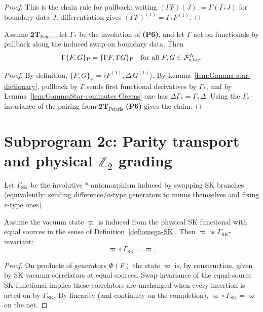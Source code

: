 \begin{proof}
This is the chain rule for pullback: writing $(\Gamma F)(J):=F(\Gamma_*J)$ for
boundary data $J$, differentiation gives $(\Gamma F)^{(1)}=\Gamma_* F^{(1)}$.
\end{proof}

\begin{lemma}
\label{lem:Gamma-Poisson}
Assume $\mathbf{2T}_{\mathrm{Peierls}}$, let $\Gamma_*$ be the involution of
\textbf{(P6)}, and let $\Gamma$ act on functionals by pullback along the
induced swap on boundary data. Then
\[
\Gamma\{F,G\}_{\mathrm P} = \{\Gamma F,\Gamma G\}_{\mathrm P}
\quad\text{for all }F,G\in\mathcal F_{\mathrm{s.loc}}^\Lambda.
\]
\end{lemma}

\begin{proof}
By definition, $\{F,G\}_{\mathrm P}=\langle F^{(1)},\Delta\,G^{(1)}\rangle$.
By Lemma~\ref{lem:Gamma-star-dictionary}, pullback by $\Gamma$ sends first
functional derivatives by $\Gamma_*$, and by
Lemma~\ref{lem:GammaStar-commutes-Greens} one has $\Delta\Gamma_*=\Gamma_*\Delta$.
Using the $\Gamma_*$--invariance of the pairing from
$\mathbf{2T}_{\mathrm{Peierls}}$-\textbf{(P6)} gives the claim.
\end{proof}

\section{Subprogram 2c: Parity transport and physical $\mathbb Z_2$ grading}
\label{sec:parity-bridge}

\begin{definition}
\label{def:GammaSK}
Let $\Gamma_{\mathrm{SK}}$ be the involutive *-automorphism induced by swapping
SK branches (equivalently: sending difference/$a$-type generators to minus
themselves and fixing $r$-type ones).
\end{definition}

\begin{lemma}
\label{lem:varpi-Gamma-invariant}
Assume the vacuum state $\varpi$ is induced from the physical SK functional with
equal sources in the sense of Definition~\ref{def:omega-SK}. Then $\varpi$ is
$\Gamma_{\mathrm{SK}}$-invariant:
\[
\varpi\circ\Gamma_{\mathrm{SK}}=\varpi.
\]
\end{lemma}

\begin{proof}
On products of generators $\Phi(F)$ the state $\varpi$ is, by construction,
given by SK vacuum correlators at equal sources. Swap-invariance of the
equal-source SK functional implies these correlators are unchanged when every
insertion is acted on by $\Gamma_{\mathrm{SK}}$. By linearity (and continuity on
the completion), $\varpi\circ\Gamma_{\mathrm{SK}}=\varpi$ on the net.
\end{proof}

